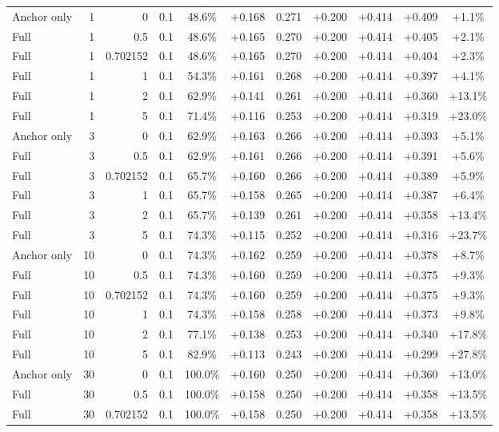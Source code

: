 \begin{table}[htbp]
\begin{tabular}{lrrrccccccc}
Anchor only & 1 & 0 & 0.1 & 48.6\% & +0.168 & 0.271 & +0.200 & +0.414 & +0.409 & +1.1\% \\
Full & 1 & 0.5 & 0.1 & 48.6\% & +0.165 & 0.270 & +0.200 & +0.414 & +0.405 & +2.1\% \\
Full & 1 & 0.702152 & 0.1 & 48.6\% & +0.165 & 0.270 & +0.200 & +0.414 & +0.404 & +2.3\% \\
Full & 1 & 1 & 0.1 & 54.3\% & +0.161 & 0.268 & +0.200 & +0.414 & +0.397 & +4.1\% \\
Full & 1 & 2 & 0.1 & 62.9\% & +0.141 & 0.261 & +0.200 & +0.414 & +0.360 & +13.1\% \\
Full & 1 & 5 & 0.1 & 71.4\% & +0.116 & 0.253 & +0.200 & +0.414 & +0.319 & +23.0\% \\
Anchor only & 3 & 0 & 0.1 & 62.9\% & +0.163 & 0.266 & +0.200 & +0.414 & +0.393 & +5.1\% \\
Full & 3 & 0.5 & 0.1 & 62.9\% & +0.161 & 0.266 & +0.200 & +0.414 & +0.391 & +5.6\% \\
Full & 3 & 0.702152 & 0.1 & 65.7\% & +0.160 & 0.266 & +0.200 & +0.414 & +0.389 & +5.9\% \\
Full & 3 & 1 & 0.1 & 65.7\% & +0.158 & 0.265 & +0.200 & +0.414 & +0.387 & +6.4\% \\
Full & 3 & 2 & 0.1 & 65.7\% & +0.139 & 0.261 & +0.200 & +0.414 & +0.358 & +13.4\% \\
Full & 3 & 5 & 0.1 & 74.3\% & +0.115 & 0.252 & +0.200 & +0.414 & +0.316 & +23.7\% \\
Anchor only & 10 & 0 & 0.1 & 74.3\% & +0.162 & 0.259 & +0.200 & +0.414 & +0.378 & +8.7\% \\
Full & 10 & 0.5 & 0.1 & 74.3\% & +0.160 & 0.259 & +0.200 & +0.414 & +0.375 & +9.3\% \\
Full & 10 & 0.702152 & 0.1 & 74.3\% & +0.160 & 0.259 & +0.200 & +0.414 & +0.375 & +9.3\% \\
Full & 10 & 1 & 0.1 & 74.3\% & +0.158 & 0.258 & +0.200 & +0.414 & +0.373 & +9.8\% \\
Full & 10 & 2 & 0.1 & 77.1\% & +0.138 & 0.253 & +0.200 & +0.414 & +0.340 & +17.8\% \\
Full & 10 & 5 & 0.1 & 82.9\% & +0.113 & 0.243 & +0.200 & +0.414 & +0.299 & +27.8\% \\
Anchor only & 30 & 0 & 0.1 & 100.0\% & +0.160 & 0.250 & +0.200 & +0.414 & +0.360 & +13.0\% \\
Full & 30 & 0.5 & 0.1 & 100.0\% & +0.158 & 0.250 & +0.200 & +0.414 & +0.358 & +13.5\% \\
Full & 30 & 0.702152 & 0.1 & 100.0\% & +0.158 & 0.250 & +0.200 & +0.414 & +0.358 & +13.5\% \\

\end{tabular}
\end{table}

